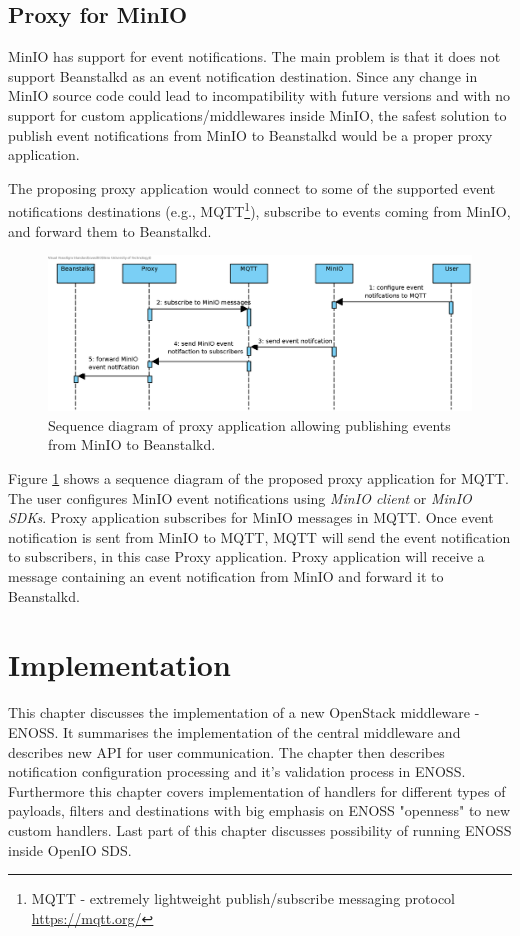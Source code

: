 \section{Proxy for MinIO}
    MinIO has support for event notifications. The main problem is that it does not support Beanstalkd as an event notification destination. Since any change in MinIO source code could lead to incompatibility with future versions and with no support for custom applications/middlewares inside MinIO, the safest solution to publish event notifications from MinIO to Beanstalkd would be a proper proxy application.

    The proposing proxy application would connect to some of the supported event notifications destinations (e.g., MQTT\footnote{MQTT - extremely lightweight publish/subscribe messaging protocol {\url{https://mqtt.org/}}}), subscribe to events coming from MinIO, and forward them to Beanstalkd.

    \begin{figure}[H]
        \centering
        \includegraphics[angle=90,height=0.78\textheight]{obrazky-figures/minio-proxy.eps}
        \caption{Sequence diagram of proxy application allowing publishing events from MinIO to Beanstalkd.}
        \label{fig:minioProxy}
    \end{figure}

    Figure \ref{fig:minioProxy} shows a sequence diagram of the proposed proxy application for MQTT. The user configures MinIO event notifications using \textit{MinIO client} or \textit{MinIO SDKs}. Proxy application subscribes for MinIO messages in MQTT. Once event notification is sent from MinIO to MQTT, MQTT will send the event notification to subscribers, in this case Proxy application. Proxy application will receive a message containing an event notification from MinIO and forward it to Beanstalkd.


\chapter{Implementation}\label{chap:implementation}
    This chapter discusses the implementation of a new OpenStack middleware - ENOSS. It summarises the implementation of the central middleware and describes new API for user communication. The chapter then describes notification configuration processing and it's validation process in ENOSS. Furthermore this chapter covers implementation of handlers for different types of payloads, filters and destinations with big emphasis on ENOSS "openness" to new custom handlers. Last part of this chapter discusses possibility of running ENOSS inside OpenIO SDS.

